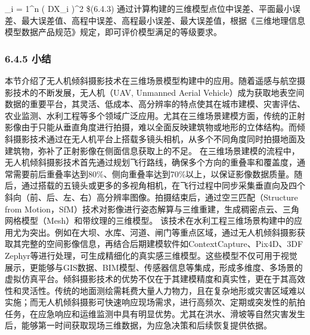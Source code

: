 {\sum\limits_{i = 1}^n {{{\left( {D{X_i}} \right)}^2}} } \$(6.4.3) 通过计算构建的三维模型点位中误差、平面最小误差、最大误差值、高程中误差、高程最小误差、最大误差值，根据《三维地理信息模型数据产品规范》规定，即可评价模型满足的等级要求。 \subsubsection{6.4.5 小结}\label{ux5c0fux7ed3} 本节介绍了无人机倾斜摄影技术在三维场景模型构建中的应用。随着遥感与航空摄影技术的不断发展，无人机（UAV, Unmanned Aerial Vehicle）成为获取地表空间数据的重要平台，其灵活、低成本、高分辨率的特点使其在城市建模、灾害评估、农业监测、水利工程等多个领域广泛应用。尤其在三维场景建模方面，传统的正射影像由于只能从垂直角度进行拍摄，难以全面反映建筑物或地形的立体结构。而倾斜摄影技术通过在无人机平台上搭载多镜头相机，从多个不同角度同时拍摄地面及建筑物，弥补了正射影像在侧面信息获取上的不足。 在三维场景建模的流程中，无人机倾斜摄影技术首先通过规划飞行路线，确保多个方向的重叠率和覆盖度，通常需要前后重叠率达到80\%、侧向重叠率达到70\%以上，以保证影像数据质量。随后，通过搭载的五镜头或更多的多视角相机，在飞行过程中同步采集垂直向及四个斜向（前、后、左、右）高分辨率图像。拍摄结束后，通过空三匹配（Structure from Motion，SfM）技术对影像进行姿态解算与三维重建，生成稠密点云、三角网格模型（Mesh）和带纹理的三维模型。 该技术在水利工程三维场景构建中的应用尤为突出。例如在大坝、水库、河道、闸门等重点区域，通过无人机倾斜摄影获取其完整的空间影像信息，再结合后期建模软件如ContextCapture、Pix4D、3DF Zephyr等进行处理，可生成精细化的真实感三维模型。这些模型不仅可用于视觉展示，更能够与GIS数据、BIM模型、传感器信息等集成，形成多维度、多场景的虚拟仿真平台。倾斜摄影技术的优势不仅在于其建模精度和真实性，更在于其高效性和灵活性。传统的地面测绘需耗费大量人力物力，且在复杂地形或灾害区域难以实施；而无人机倾斜摄影可快速响应现场需求，进行高频次、定期或突发性的航拍任务，在应急响应和运维监测中具有明显优势。尤其在洪水、滑坡等自然灾害发生后，能够第一时间获取现场三维数据，为应急决策和后续恢复提供依据。 